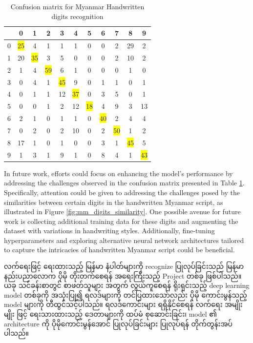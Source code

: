 \vspace{0.5em}
\begin{table}[h]
    \centering
    \begin{tabular}{|*{11}{c|}}
        \hline 
        & 0 & 1 & 2 & 3 & 4 & 5 & 6 & 7 & 8 & 9 \\
        \hline
        0 & \colorbox{yellow}{25} & 4 & 1 & 1 & 1 & 0 & 0 & 2 & 29 & 2 \\\hline
        1 & 20 & \colorbox{yellow}{35} & 3 & 5 & 0 & 0 & 0 & 2 & 10 & 2 \\\hline
        2 & 1 & 4 & \colorbox{yellow}{59} & 6 & 1 & 0 & 0 & 0 & 1 & 0 \\\hline
        3 & 0 & 4 & 1 & \colorbox{yellow}{45} & 9 & 0 & 1 & 1 & 0 & 1 \\\hline
        4 & 0 & 1 & 1 & 12 & \colorbox{yellow}{37} & 0 & 3 & 5 & 0 & 1 \\\hline
        5 & 0 & 0 & 1 & 2 & 12 & \colorbox{yellow}{18} & 4 & 9 & 3 & 13 \\\hline
        6 & 2 & 1 & 0 & 1 & 1 & 0 & \colorbox{yellow}{40} & 2 & 4 & 4 \\\hline
        7 & 0 & 2 & 0 & 2 & 10 & 0 & 2 & \colorbox{yellow}{50} & 1 & 2 \\\hline
        8 & 17 & 1 & 0 & 1 & 0 & 0 & 3 & 1 & \colorbox{yellow}{45} & 5 \\\hline
        9 & 1 & 3 & 1 & 9 & 1 & 0 & 8 & 4 & 1 & \colorbox{yellow}{43} \\
        \hline
    \end{tabular}
    \caption{Confusion matrix for Myanmar Handwritten digits recognition}
    \label{tab:p2cm}
\end{table}


In future work, efforts could focus on enhancing the model's performance by addressing the challenges observed in the confusion matrix presented in Table 
\ref{tab:p2cm}. Specifically, attention could be given to addressing the challenges posed by the similarities between certain digits in the handwritten Myanmar script, as illustrated in Figure \ref{fig:mm_digits_similarity}. One possible avenue for future work is collecting additional training data for these digits and augmenting the dataset with variations in handwriting styles. Additionally, fine-tuning hyperparameters and exploring alternative neural network architectures tailored to capture the intricacies of handwritten Myanmar script could be beneficial.

လက်ရေးဖြင့် ရေးထားသည့် မြန်မာ နံပါတ်များကို recognize ပြုလုပ်ခြင်းသည် မြန်မာ နည်းပညာလောက ပိုမို တိုးတက်စေရန် အရေးကြီးသည့် Project တစ်ခု ဖြစ်ပါသည်။ ယခု သင်ခန်းစာတွင် စာဖတ်သူများ အတွက် လွယ်ကူစေရန် ရိုးရှင်းသည့် deep learning model တစ်ခုကို အသုံးပြု၍ ရလဒ်များကို တင်ပြထားသော်လည်း ပိုမို ကောင်းမွန်သည့် model များကို တီထွင်သင့်ပါသည်။ ရလဒ်ကောင်းများ ရရှိနိုင်စေရန် လက်ရေး အမျိုးမျိုး ဖြင့် ရေးသားထားသည့် ဒေတာများကို ထပ်မံ စုဆောင်းခြင်း၊ model ၏ architecture ကို ပိုမိုကောင်းမွန်အောင် ပြုလုပ်ခြင်းများ ပြုလုပ်ရန် တိုက်တွန်းအပ်ပါသည်။ 

